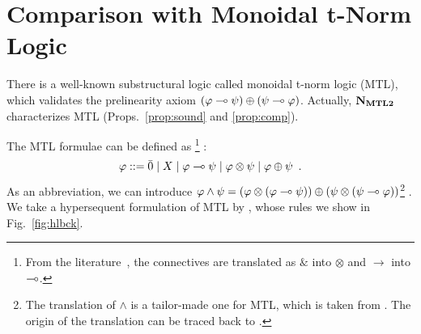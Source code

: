 \section{Comparison with Monoidal t-Norm Logic}
\label{sec:as-logic}

There is a well-known substructural logic called monoidal t-norm logic
(MTL), which validates the prelinearity axiom
$(\varphi\multimap\psi)\oplus(\psi\multimap\varphi)$.  Actually, $\mathbf{N}_{\mathbf{MTL2}}$ characterizes
MTL (Props.~\ref{prop:sound} and \ref{prop:comp}).

The MTL formulae can be defined as%
\footnote{From the literature~\citep{handbook:fuzzy}, the connectives
are translated as $\&$ into $\otimes$ and $\rightarrow$ into $\multimap$.}%
:
\[
 \varphi::= \bar{0}\mid X\mid \varphi\multimap\psi \mid \varphi\otimes \psi \mid \varphi \oplus \psi\enspace.
\]
As an abbreviation, we can introduce $\varphi\land\psi =  (\varphi\otimes(\varphi\multimap\psi))\oplus
 (\psi\otimes(\psi\multimap\varphi))$\footnote{
The translation of $\wedge$ is a tailor-made one for MTL,
 which is taken from \citep[p.~48]{handbook:fuzzy}.
 The origin of the translation
can be traced back to \citet[Lem.~6.5]{Cintula200740}.}%
.
We take a hypersequent formulation of MTL by
\citet{baaz2004analytic}, whose rules we show in Fig.~\ref{fig:hlbck}.
